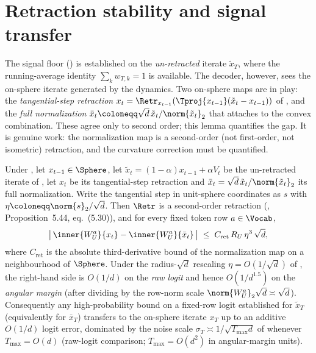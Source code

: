 \section{Retraction stability and signal transfer}
\label{sec:retraction_stability}

The signal floor () is established on the
\emph{un-retracted} iterate $\tilde x_T$, where the running-average
identity $\sum_k w_{T,k}=1$ is available. The decoder, however, sees the
on-sphere iterate generated by the dynamics. Two on-sphere maps are in
play: the \emph{tangential-step retraction}
$x_t=\Retr_{x_{t-1}}(\Tproj{x_{t-1}}(\tilde x_t-x_{t-1}))$ of
, and the \emph{full normalization}
$\bar x_t\coloneqq\sqrt d\,\tilde x_t/\norm{\tilde x_t}_2$ that
 attaches to the convex combination. These agree
only to second order; this lemma quantifies the gap. It is genuine work:
the normalization map is a second-order (not first-order, not isometric)
retraction, and the curvature correction must be quantified.

\begin{lemma}
\label{lem:retraction_stability}
Under , let $x_{t-1}\in\Sphere$, let
$\tilde x_t=(1-\alpha)x_{t-1}+\alpha V_t$ be the un-retracted iterate of
, let $x_t$ be its tangential-step retraction and
$\bar x_t=\sqrt d\,\tilde x_t/\norm{\tilde x_t}_2$ its full normalization.
Write the tangential step in unit-sphere coordinates as $s$ with
$\eta\coloneqq\norm{s}_2/\sqrt d$. Then $\Retr$ is a second-order
retraction (\cite{boumal2023}, Proposition~5.44, eq.~(5.30)), and for every
fixed token row $a\in\Vocab$,
\begin{align}\label{eq:retraction_transfer}
   \bigl|\, \inner{W_U^a}{x_t} - \inner{W_U^a}{\bar x_t} \,\bigr|
   \;\le\;
   C_{\mathrm{ret}}\, R_U\, \eta^3\,\sqrt d,
\end{align}
where $C_{\mathrm{ret}}$ is the absolute third-derivative bound of the
normalization map on a neighbourhood of $\Sphere$. Under the
radius-$\sqrt d$ rescaling $\eta=O(1/\sqrt d)$ of
, the right-hand side is $O(1/d)$ on the
\emph{raw logit} and hence $O(1/d^{1.5})$ on the \emph{angular margin}
(after dividing by the row-norm scale $\norm{W_U^a}_2\sqrt d\asymp\sqrt d$).
Consequently any high-probability bound on a fixed-row logit established for
$\tilde x_T$ (equivalently for $\bar x_T$) transfers to the on-sphere
iterate $x_T$ up to an additive $O(1/d)$ logit error, dominated by the
noise scale $\sigma_T\asymp1/\sqrt{T_{\max}d}$ of 
whenever $T_{\max}=O(d)$ (raw-logit comparison; $T_{\max}=O(d^2)$ in
angular-margin units).
\end{lemma}

